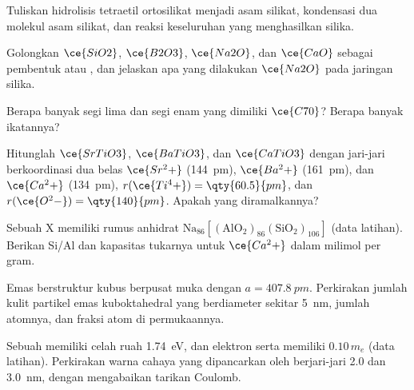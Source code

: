 \begin{exercise}[$\star$]\label{exo:b3:inorganic-materials:2}
Tuliskan hidrolisis tetraetil ortosilikat menjadi asam silikat,
kondensasi dua molekul asam silikat, dan reaksi keseluruhan yang menghasilkan
silika.
\end{exercise}

\begin{exercise}[$\star$]\label{exo:b3:inorganic-materials:3}
Golongkan $\ce{SiO2}$, $\ce{B2O3}$, $\ce{Na2O}$, dan $\ce{CaO}$ sebagai pembentuk atau , dan jelaskan apa yang
dilakukan $\ce{Na2O}$ pada jaringan silika.
\end{exercise}

\begin{exercise}[$\star$]\label{exo:b3:inorganic-materials:4}
Berapa banyak segi lima dan segi enam yang dimiliki $\ce{C70}$? Berapa banyak ikatannya?
\end{exercise}

\begin{exercise}[$\star\star$]\label{exo:b3:inorganic-materials:5}
Hitunglah  $\ce{SrTiO3}$, $\ce{BaTiO3}$, dan $\ce{CaTiO3}$ dengan jari-jari berkoordinasi dua belas
$\ce{Sr^2+}$ (\qty{144}{pm}), $\ce{Ba^2+}$ (\qty{161}{pm}), dan $\ce{Ca^2+}$ (\qty{134}{pm}), $r(\ce{Ti^4+}) = \qty{60.5}{pm}$, dan $r(\ce{O^2-}) = \qty{140}{pm}$. Apakah
yang diramalkannya?
\end{exercise}

\begin{exercise}[$\star\star$]\label{exo:b3:inorganic-materials:6}
Sebuah  X memiliki rumus anhidrat $\mathrm{Na_{86}[(AlO_2)_{86}(SiO_2)_{106}]}$ (data latihan).
Berikan Si/Al dan kapasitas tukarnya untuk $\ce{Ca^2+}$ dalam milimol per gram.
\end{exercise}

\begin{exercise}[$\star\star$]\label{exo:b3:inorganic-materials:7}
Emas berstruktur kubus berpusat muka dengan $a = \qty{407.8}{pm}$. Perkirakan jumlah kulit
partikel emas kuboktahedral yang berdiameter sekitar \qty{5}{nm}, jumlah atomnya, dan
fraksi atom di permukaannya.
\end{exercise}

\begin{exercise}[$\star\star$]\label{exo:b3:inorganic-materials:8}
Sebuah  memiliki celah ruah \qty{1.74}{eV}, dan elektron serta  memiliki  $0.10\,m_e$ (data latihan). Perkirakan warna cahaya yang dipancarkan oleh
 berjari-jari 2.0 dan \qty{3.0}{nm}, dengan mengabaikan tarikan Coulomb.
\end{exercise}

